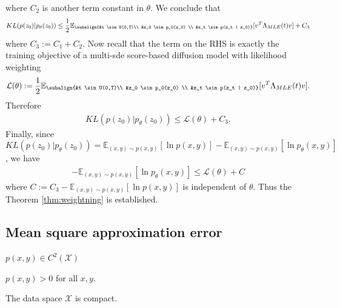 where $C_2$ is another term constant in $\theta$.
We conclude that 
\begin{align*}
    KL(p(z_0) | p_\theta(z_0)) \leq \frac{1}{2} \mathbb{E}_{\subalign{&t \sim U(0,T)\\ &z_0 \sim p_0(z_0) \\ &z_t \sim p(z_t | z_0)}} 
    [
        v^T \Lambda_{MLE}(t) v
    ] + C_3
\end{align*}
where $C_3 := C_1 + C_2$.
Now recall that the term on the RHS is exactly the training objective of a multi-sde score-based diffusion model with likelihood weighting
\begin{gather*}
    \begin{aligned}
        \mathcal{L}(\theta) := \frac{1}{2} \mathbb{E}_{\subalign{&t \sim U(0,T)\\ &z_0 \sim p_0(z_0) \\ &z_t \sim p(z_t | z_0)}} 
        [
            v^T \Lambda_{MLE}(t) v
        ].
    \end{aligned}
\end{gather*}
Therefore
\begin{align*}
    KL(p(z_0) | p_\theta(z_0)) \leq \mathcal{L}(\theta)  + C_3.
\end{align*}
Finally, since $KL(p(z_0) | p_\theta(z_0))  = \mathbb{E}_{(x,y) \sim p(x,y)}[\ln p(x,y)]  - \mathbb{E}_{(x,y) \sim p(x,y)}[\ln p_\theta(x,y)]$, we have 
\begin{gather*}
    -\mathbb{E}_{(x,y) \sim p(x,y)}[\ln p_\theta(x,y)] \leq \mathcal{L}(\theta) + C
\end{gather*}
where $C := C_3 - \mathbb{E}_{(x,y) \sim p(x,y)}[\ln p(x,y)] $ is independent of $\theta$. Thus the Theorem \ref{thm:weightning} is established.

\subsection{Mean square approximation error}
\label{appendix:mse}

\begin{assumption}
    \label{assum: c2}
    $p(x,y) \in C^2(\mathcal{X})$\
\end{assumption}
\begin{assumption}
    \label{assum: lower_bound}
    $p(x,y) > 0$ for all $x,y$.
\end{assumption}
\begin{assumption}
    \label{assum: compact_2}
    The data space $\mathcal{X}$ is compact.
\end{assumption}

